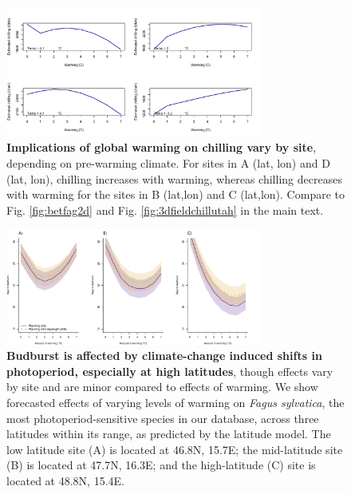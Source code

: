 \documentclass{article}
\begin{document}
\begin{figure}[h!]
\centering
\noindent \includegraphics[width=0.75\textwidth]{..//..//analyses/bb_analysis/figures/forecasting/chillforecast_bothspp_PEP_utah.pdf}
\caption{\textbf{Implications of global warming on chilling vary by site}, depending on pre-warming climate. For sites in A (lat, lon) and D (lat, lon), chilling increases with warming, whereas chilling decreases with warming for the sites in B (lat,lon) and C (lat,lon). Compare to Fig. \ref{fig:betfag2d} and Fig. \ref{fig:3dfieldchillutah} in the main text.}
\label{fig:chillfore}
\end{figure}

\begin{figure}[h!]
\centering
\noindent \includegraphics[width=0.75\textwidth]{..//..//analyses/bb_analysis/figures/forecasting/fagsyl_3lats.pdf}
\caption{\textbf{Budburst is affected by climate-change induced shifts in photoperiod, especially at high latitudes}, though effects vary by site and are minor compared to effects of warming. We show forecasted effects of varying levels of warming on \emph{Fagus sylvatica}, the most photoperiod-sensitive species in our database, across three latitudes within its range, as predicted by the latitude model. The low latitude site (A) is  located at 46.8\degree N, 15.7\degree E; the mid-latitude site (B) is located at 47.7\degree N, 16.3\degree E; and the high-latitude (C) site is located at 48.8\degree N, 15.4\degree E.}
\label{fig:fagsyllat}
\end{figure}
\end{document}
